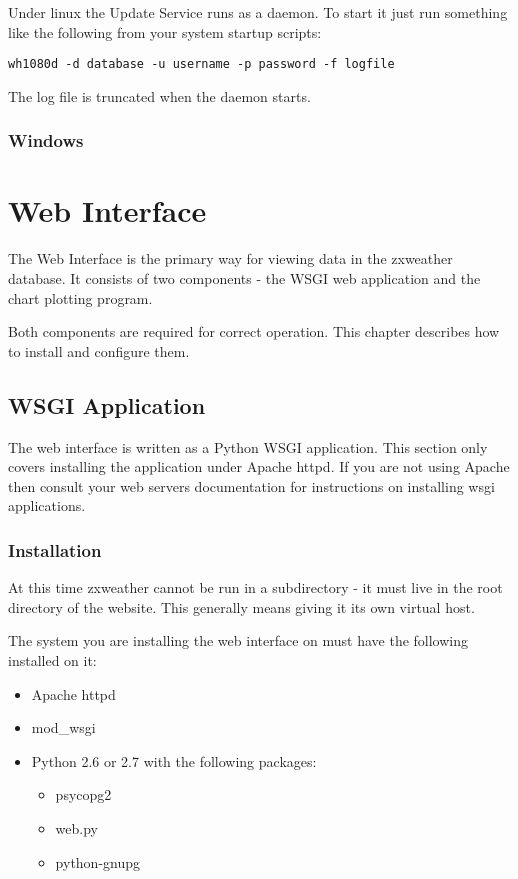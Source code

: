 \documentclass[a4paper,10pt,draft]{book}
\begin{document}
Under linux the Update Service runs as a daemon. To start it just run something like the following from your system startup scripts:

\verb|wh1080d -d database -u username -p password -f logfile|

The log file is truncated when the daemon starts.

\subsection{Windows}


\chapter{Web Interface}

The Web Interface is the primary way for viewing data in the zxweather database. It consists of two components - the WSGI web application and the chart plotting program.

Both components are required for correct operation. This chapter describes how to install and configure them.


\section{WSGI Application}

The web interface is written as a Python WSGI application. This section only covers installing the application under Apache httpd. If you are not using Apache then consult your web servers documentation for instructions on installing wsgi applications.

\subsection{Installation}

At this time zxweather cannot be run in a subdirectory - it must live in the root directory of the website. This generally means giving it its own virtual host.

The system you are installing the web interface on must have the following installed on it:
\begin{itemize}
\item Apache httpd
\item mod\_wsgi
\item Python 2.6 or 2.7 with the following packages:
\begin{itemize}
\item psycopg2
\item web.py
\item python-gnupg
\end{itemize}
\end{itemize}
\end{document}
